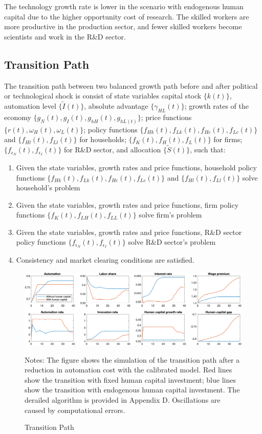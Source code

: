 \documentclass[12pt]{article}
\begin{document}
The technology growth rate is lower in the scenario with endogenous human capital due to the higher opportunity cost of research. The skilled workers are more productive in the production sector, and fewer skilled workers become scientists and work in the R\&D sector. 

\subsection{Transition Path}

The transition path between two balanced growth path before and after political or technological shock is consist of state variables capital stock $\{k(t)\}$, automation level $\{\tilde{I}(t)\}$, absolute advantage $\{\gamma_{HL}(t)\}$; growth rates of the economy $\{g_N(t), g_I(t), g_{hH}(t),g_{hL(t)}\}$; price functions $\{r(t), \omega_H(t), \omega_L(t)\}$; policy functions $\{f_{Hk}(t), f_{Lk}(t), f_{Hc}(t), f_{Lc}(t)\}$ and $\{f_{Hl}(t), f_{Ll}(t)\}$ for households; $\{f_{K}(t), f_{H}(t), f_{L}(t)\}$ for firms; $\{f_{\epsilon_N}(t), f_{\epsilon_I}(t)\}$ for R\&D sector, and allocation $\{\tilde{S}(t)\}$, such that: 
\begin{enumerate}
\item Given the state variables, growth rates and price functions, household policy functions  $\{f_{Hk}(t), f_{Lk}(t), f_{Hc}(t), f_{Lc}(t)\}$ and $\{f_{Hl}(t), f_{Ll}(t)\}$ solve household's problem
\item Given the state variables, growth rates and price functions, firm policy functions $\{f_{K}(t), f_{LH}(t), f_{LL}(t)\}$ solve firm's problem
\item Given the state variables, growth rates and price functions, R\&D sector policy functions $\{f_{\epsilon_N}(t), f_{\epsilon_I}(t)\}$ solve  R\&D sector's problem
\item Consistency and market clearing conditions are satisfied. 
\end{enumerate}

\begin{figure}[h!]
\includegraphics[width=\textwidth]{Transition}
\caption{Transition Path}
\label{transition}
{\scriptsize Notes: The figure shows the simulation of the transition path after a reduction in automation cost with the calibrated model. Red lines show the transition with fixed human capital investment; blue lines show the transition with endogenous human capital investment. The derailed algorithm is provided in Appendix D. Oscillations are caused by computational errors.}
\end{figure}
\end{document}
